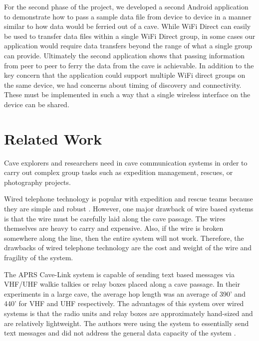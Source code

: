 \documentclass[10pt,twocolumn]{article}
\begin{document}
For the second phase of the project, we developed a second Android application to demonstrate how to pass a sample data file from device to device in a manner similar to how data would be ferried out of a cave.
While WiFi Direct can easily be used to transfer data files within a single WiFi Direct group, in some cases our application would require data transfers beyond the range of what a single group can provide.
Ultimately the second application shows that passing information from peer to peer to ferry the data from the cave is achievable. 
In addition to the key concern that the application could support multiple WiFi direct groups on the same device, we had concerns about timing of discovery and connectivity.
These must be implemented in such a way that a single wireless interface on the device can be shared.



\section{Related Work}
Cave explorers and researchers need in cave communication systems in order to carry out complex group tasks such as expedition management, rescues, or photography projects.

Wired telephone technology is popular with expedition and rescue teams because they are simple and robust \cite{cavecomm}.
However, one major drawback of wire based systems is that the wire must be carefully laid along the cave passage. 
The wires themselves are heavy to carry and expensive.
Also, if the wire is broken somewhere along the line, then the entire system will not work.
Therefore, the drawbacks of wired telephone technology are the cost and weight of the wire and fragility of the system.

The APRS Cave-Link system is capable of sending text based messages via VHF/UHF walkie talkies or relay boxes placed along a cave passage.
In their experiments in a large cave, the average hop length was an average of 390' and 440' for VHF and UHF respectively.
The advantages of this system over wired systems is that the radio units and relay boxes are approximately hand-sized and are relatively lightweight.
The authors were using the system to essentially send text messages and did not address the general data capacity of the system \cite{cavelink}.
\end{document}
